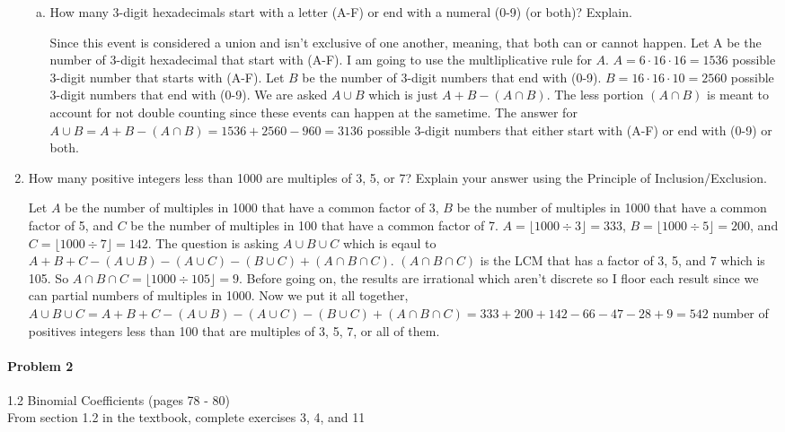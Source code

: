 \documentclass[11pt, a4paper]{article}
\newcommand\setItemNumber[1]{\setcounter{enumi}{\numexpr#1-1\relax}}
\begin{document}
\begin{enumerate}
\begin{enumerate}[(a)]
            \item How many 3-digit hexadecimals start with a letter (A-F) or end with a numeral (0-9) (or both)? Explain.

                Since this event is considered a union and isn't exclusive of one another, meaning, that both can or cannot happen. Let A be the number of 3-digit hexadecimal that start with (A-F). I am going to use the multliplicative rule for $A$. $A = 6 \cdot 16 \cdot 16 = 1536$ possible 3-digit number that starts with (A-F). Let $B$ be the number of 3-digit numbers that end with (0-9). $B = 16 \cdot 16 \cdot 10 = 2560$ possible 3-digit numbers that end with (0-9). We are asked $A \cup B$ which is just $A + B - (A \cap B)$. The less portion $(A \cap B)$ is meant to account for not double counting since these events can happen at the sametime. The answer for $A \cup B = A + B - (A\cap B) = 1536 + 2560 - 960 = 3136$ possible 3-digit numbers that either start with (A-F) or end with (0-9) or both.
        

        \end{enumerate}

        \setItemNumber{10}
        \item How many positive integers less than 1000 are multiples of 3, 5, or 7? Explain your answer using the Principle of Inclusion/Exclusion.

            Let $A$ be the number of multiples in 1000 that have a common factor of 3, $B$ be the number of multiples in 1000 that have a common factor of 5, and $C$ be the number of multiples in 100 that have a common factor of 7. $A = \lfloor 1000 \div 3 \rfloor = 333$, $B = \lfloor 1000 \div 5 \rfloor = 200$, and $C = \lfloor 1000 \div 7 \rfloor = 142$. The question is asking $A \cup B \cup C$ which is eqaul to $A + B + C - (A\cup B) - (A\cup C) - (B\cup C) + (A\cap B \cap C)$. $(A\cap B \cap C)$ is the LCM that has a factor of 3, 5, and 7 which is 105. So $A\cap B\cap C = \lfloor 1000\div 105\rfloor = 9$. Before going on, the results are irrational which aren't discrete so I floor each result since we can partial numbers of multiples in 1000. Now we put it all together, $ A\cup B\cup C = A + B + C - (A\cup B) - (A\cup C) - (B\cup C) + (A\cap B \cap C) = 333 + 200 + 142 - 66 - 47 - 28 + 9 = 542$ number of positives integers less than 100 that are multiples of 3, 5, 7, or all of them.

    \end{enumerate}
	
	\paragraph{Problem 2} 1.2 Binomial Coefficients  (pages 78 - 80)\\
	From section 1.2 in the textbook, complete exercises 3, 4, and 11
\end{document}
